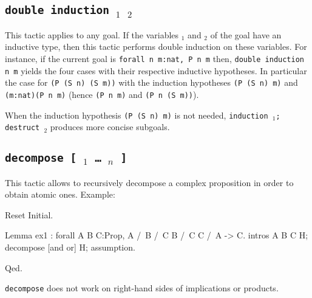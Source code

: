\subsection{\tt double induction \ident$_1$ \ident$_2$
}

This tactic applies to any goal. If the variables {\ident$_1$} and
{\ident$_2$} of the goal have an inductive type, then this tactic
performs double induction on these variables.  For instance, if the
current goal is \verb+forall n m:nat, P n m+ then, {\tt double induction n
  m} yields the four cases with their respective inductive hypotheses.
In particular the case for \verb+(P (S n) (S m))+ with the induction
hypotheses \verb+(P (S n) m)+ and \verb+(m:nat)(P n m)+ (hence
\verb+(P n m)+ and \verb+(P n (S m))+).

\Rem When the induction hypothesis \verb+(P (S n) m)+ is not
needed, {\tt induction \ident$_1$; destruct \ident$_2$} produces
more concise subgoals.


\subsection{\tt decompose [ {\qualid$_1$} \dots\ {\qualid$_n$} ] \term
\label{decompose}
}

This tactic allows to recursively decompose a
complex proposition in order to obtain atomic ones.
Example: 

\begin{coq_eval}
Reset Initial.
\end{coq_eval}
\begin{coq_example}
Lemma ex1 : forall A B C:Prop, A /\ B /\ C \/ B /\ C \/ C /\ A -> C.
intros A B C H; decompose [and or] H; assumption.
\end{coq_example}
\begin{coq_example*}
Qed.
\end{coq_example*}

{\tt decompose} does not work on right-hand sides of implications or products.

